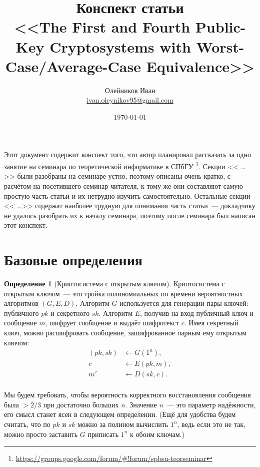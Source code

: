 \documentclass[oneside, a4paper]{article}
\theoremstyle{plain}
\theoremstyle{definition}
\newtheorem{definition}{Определение}
\theoremstyle{remark}
\begin{document}
\title{Конспект статьи \\ \foreignlanguage{english}{<<The First and Fourth Public-Key Cryptosystems
with Worst-Case/Average-Case Equivalence>>  \cite{ajtaidwork}}}
\author{Олейников Иван \\ \url{ivan.oleynikov95@gmail.com}}
\date{\today}
\maketitle

Этот документ содержит конспект того, что автор планировал рассказать за одно
занятие на семинара по теоретической информатике в СПбГУ
\footnote{\url{https://groups.google.com/forum/\#!forum/spbsu-teorseminar}}.
Секции << \dots >> были разобраны на семинаре устно, поэтому описаны очень
кратко, с расчётом на посетившего семинар читателя, к тому же они составляют
самую простую часть статьи и их нетрудно изучить самостоятельно. Остальные
секции << \dots >> содержат наиболее трудную для понимания часть статьи~---
докладчику не удалось разобрать их к началу семинара, поэтому после семинара был
написан этот конспект.


\tableofcontents

\section{Базовые определения}

\begin{definition}[Криптосистема с открытым ключом]
Криптосистема с открытым ключом~--- это тройка полиномиальных по времени
вероятностных алгоритмов $(G, E, D)$. Алгоритм $G$ используется для генерации
пары ключей: публичного $pk$ и секретного $sk$.
Алгоритм $E$, получив на вход публичный ключ и сообщение $m$, шифрует сообщение
и выдаёт шифротекст $c$. Имея секретный ключ, можно
расшифровать сообщение, зашифрованное парным ему открытым ключом:
\[
\begin{aligned}
(pk, sk) &\gets G(1^n), \\
c        &\gets E(pk, m), \\
m'       &\gets D(sk, c). \\
\end{aligned}
\]

Мы будем требовать, чтобы вероятность корректного восстановления сообщения была
$> 2/3$ при достаточно больших $n$. Значение $n$~--- это параметр надёжности,
его смысл станет ясен в следующем определении. (Ещё для удобства будем считать,
что по $pk$ и $sk$ можно за полином вычислить $1^n$, ведь если это не так,
можно просто заставить $G$ приписать $1^n$ к обоим ключам.)
\end{definition}
\end{document}
